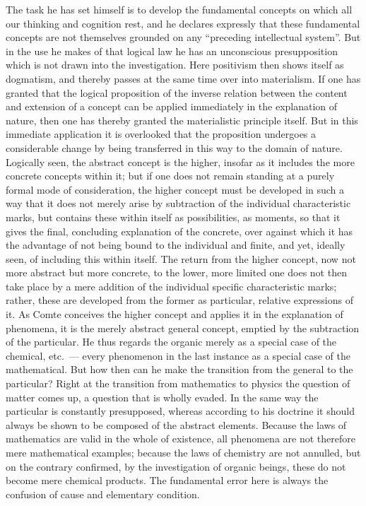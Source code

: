 \documentclass[12pt,a4paper,openany]{book}
\newcommand{\opage}[1]{\marginnote{\footnotesize\textit{[#1]}}}
\begin{document}
The task he has set himself is to develop the
fundamental concepts on which all our thinking and cognition
rest, and he declares expressly that these fundamental
concepts are not themselves grounded on any ``preceding
intellectual system''. But in the use he makes of
that logical law he has an unconscious presupposition which is not
drawn into the investigation. Here positivism then shows itself
as dogmatism, and thereby passes at the same time over into materialism.
If one has granted that the logical proposition of
the inverse relation between the content and extension of a concept
can be applied immediately in the explanation of nature,
then one has thereby granted the materialistic principle itself.
But in this immediate application it is overlooked that
the proposition undergoes a considerable change by being transferred
in this way to the domain of nature. Logically seen,
the abstract concept is the higher, insofar as it includes
the more concrete concepts within it; but if one does not remain
standing at a purely formal mode of consideration, the
\opage{204}higher concept must be developed in such a way that it does not merely arise
by subtraction of the individual characteristic marks, but contains
these within itself as possibilities, as moments, so that it
gives the final, concluding explanation of the concrete, over against
which it has the advantage of not being bound to the
individual and finite, and yet, ideally seen, of including this within
itself. The return from the higher concept, now not more abstract but
more concrete, to the lower, more limited one does not then take place
by a mere addition of the individual specific characteristic marks;
rather, these are developed from the former as particular, relative
expressions of it. As Comte conceives the higher concept
and applies it in the explanation of phenomena, it is
the merely abstract general concept, emptied by the subtraction of the particular.
He thus regards the organic merely
as a special case of the chemical, etc.\ --- every
phenomenon in the last instance as a special case of the
mathematical. But how then can he make the transition
from the general to the particular? Right at the transition
from mathematics to physics the question of
matter comes up, a question that is wholly evaded. In
the same way the particular is constantly presupposed, whereas
according to his doctrine it should always be shown to be composed
of the abstract elements. Because the laws of mathematics are valid
in the whole of existence, all phenomena are not therefore
mere mathematical examples; because the laws of chemistry are not annulled,
but on the contrary confirmed, by the investigation of
organic beings, these do not become mere chemical products.
The fundamental error here is always the confusion of cause
and elementary condition.
\end{document}

